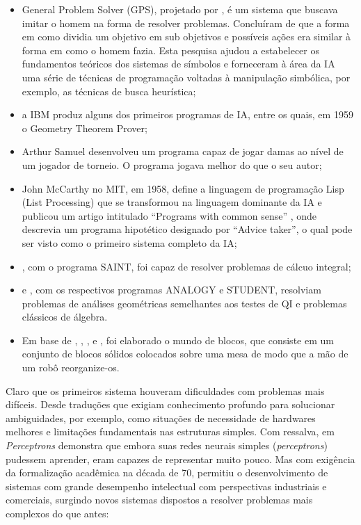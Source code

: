 \documentclass[
]{book}
\begin{document}
\begin{itemize}
\item
  General Problem Solver (GPS), projetado por \citet{newell1959variety}, é um sistema que buscava imitar o homem na forma de resolver problemas. Concluíram de que a forma em como dividia um objetivo em sub objetivos e possíveis ações era similar à forma em como o homem fazia. Esta pesquisa ajudou a estabelecer os fundamentos teóricos dos sistemas de símbolos e forneceram à área da IA uma série de técnicas de programação voltadas à manipulação simbólica, por exemplo, as técnicas de busca heurística;
\item
  a IBM produz alguns dos primeiros programas de IA, entre os quais, em 1959 o
  Geometry Theorem Prover;
\item
  Arthur Samuel desenvolveu um programa capaz de jogar damas ao nível de um
  jogador de torneio. O programa jogava melhor do que o seu autor;
\item
  John McCarthy no MIT, em 1958, define a linguagem de programação Lisp (List Processing) que se transformou na linguagem dominante
  da IA e publicou um artigo intitulado ``Programs with common sense'' \citep{mccarthy1968programs},
  onde descrevia um programa hipotético designado por ``Advice taker'', o qual pode
  ser visto como o primeiro sistema completo da IA;
\item
  \citet{slagle1963heuristic}, com o programa SAINT, foi capaz de resolver problemas de cálcuo integral;
\item
  \citet{evans1964program} e \citet{bobrow1967problems}, com os respectivos programas ANALOGY e STUDENT, resolviam problemas de análises geométricas semelhantes aos testes de QI e problemas clássicos de álgebra.
\item
  Em base de \citet{huffman1971impossible}, \citet{waltz1975understanding}, \citet{winograd1972understanding}, \citet{winston1970learning} e \citet{fahlman1974planning}, foi elaborado o mundo de blocos, que consiste em um conjunto de blocos sólidos colocados sobre uma mesa de modo que a mão de um robô reorganize-os.
\end{itemize}

Claro que os primeiros sistema houveram dificuldades com problemas mais difíceis. Desde traduções que exigiam conhecimento profundo para solucionar ambiguidades, por exemplo, como situações de necessidade de hardwares melhores e limitações fundamentais nas estruturas simples. Com ressalva, em \emph{Perceptrons} \citep{minsky1969perceptrons} demonstra que embora suas redes neurais simples (\emph{perceptrons}) pudessem aprender, eram capazes de representar muito pouco. Mas com exigência da formalização acadêmica na década de 70, permitiu o desenvolvimento de sistemas com grande desempenho intelectual com perspectivas industriais e comerciais, surgindo novos sistemas dispostos a resolver problemas mais complexos do que antes:
\end{document}
